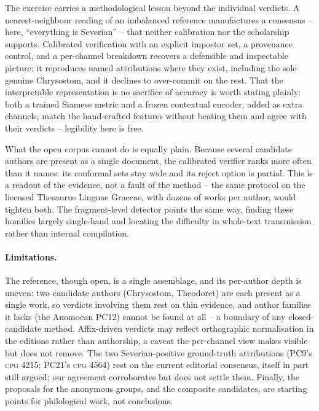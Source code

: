 \documentclass{anthology-ch}
\begin{document}
The exercise carries a methodological lesson beyond the individual verdicts. A nearest-neighbour reading of an imbalanced reference manufactures a consensus -- here, ``everything is Severian'' -- that neither calibration nor the scholarship supports. Calibrated verification with an explicit impostor set, a provenance control, and a per-channel breakdown recovers a defensible and inspectable picture: it reproduces named attributions where they exist, including the sole genuine Chrysostom, and it declines to over-commit on the rest. That the interpretable representation is no sacrifice of accuracy is worth stating plainly: both a trained Siamese metric and a frozen contextual encoder, added as extra channels, match the hand-crafted features without beating them and agree with their verdicts -- legibility here is free.

What the open corpus cannot do is equally plain. Because several candidate authors are present as a single document, the calibrated verifier ranks more often than it names: its conformal sets stay wide and its reject option is partial. This is a readout of the evidence, not a fault of the method -- the same protocol on the licensed Thesaurus Linguae Graecae, with dozens of works per author, would tighten both. The fragment-level detector points the same way, finding these homilies largely single-hand and locating the difficulty in whole-text transmission rather than internal compilation.

\paragraph{Limitations.} The reference, though open, is a single assemblage, and its per-author depth is uneven: two candidate authors (Chrysostom, Theodoret) are each present as a single work, so verdicts involving them rest on thin evidence, and author families it lacks (the Anomoean PC12) cannot be found at all -- a boundary of any closed-candidate method. Affix-driven verdicts may reflect orthographic normalisation in the editions rather than authorship, a caveat the per-channel view makes visible but does not remove. The two Severian-positive ground-truth attributions (PC9's \textsc{cpg} 4215; PC21's \textsc{cpg} 4564) rest on the current editorial consensus, itself in part still argued; our agreement corroborates but does not settle them. Finally, the proposals for the anonymous groups, and the composite candidates, are starting points for philological work, not conclusions.
\end{document}
